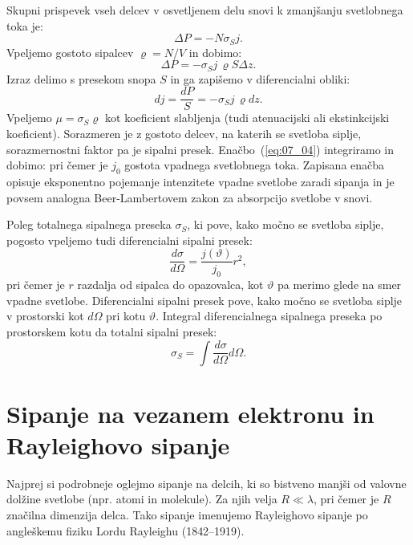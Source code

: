 Skupni prispevek vseh delcev v osvetljenem delu snovi k zmanjšanju svetlobnega toka
je:
\begin{equation}
\Delta P = - N \sigma_S j.
\label{eq:07_02}
\end{equation}
Vpeljemo gostoto sipalcev $\varrho = N/V$ in dobimo:
\begin{equation}
\Delta P = - \sigma_S j\,\varrho S \Delta z.
\label{eq:07_03}
\end{equation}
Izraz delimo s presekom snopa $S$ in ga zapišemo v diferencialni obliki:
\begin{equation}
dj = \frac{dP}{S} = - \sigma_S j\, \varrho dz.
\label{eq:07_04}
\end{equation}
Vpeljemo $\mu = \sigma_S \varrho$ kot koeficient slabljenja
(tudi atenuacijski ali ekstinkcijski
koeficient). Sorazmeren je z gostoto delcev, na katerih se svetloba siplje, sorazmernostni
faktor pa je sipalni presek. Enačbo~(\ref{eq:07_04}) integriramo in dobimo:
pri čemer je $j_0$ gostota vpadnega svetlobnega toka. Zapisana enačba 
opisuje eksponentno pojemanje intenzitete vpadne svetlobe zaradi 
sipanja in je povsem analogna Beer-Lambertovem zakon za absorpcijo svetlobe v snovi. 

\begin{remark}
Poleg totalnega sipalnega preseka $\sigma_S$, ki pove, kako močno se svetloba siplje,
pogosto vpeljemo tudi diferencialni sipalni presek:
\begin{equation}
\frac{d\sigma}{d\Omega} = \frac{j(\vartheta)}{j_0} r^2,
\label{eq:07_04a}
\end{equation}
pri čemer je $r$ razdalja od sipalca do opazovalca, kot $\vartheta$ pa merimo
glede na smer vpadne svetlobe. Diferencialni sipalni
presek pove, kako močno se svetloba siplje v prostorski kot $d\Omega$ pri kotu $\vartheta$. 
Integral diferencialnega sipalnega preseka po prostorskem kotu da totalni
sipalni presek:
\begin{equation}
\sigma_S = \int \frac{d\sigma}{d\Omega} d\Omega.
\label{eq:07_04b}
\end{equation}
\end{remark}

\section{Sipanje na vezanem elektronu in Rayleighovo sipanje}
Najprej si podrobneje oglejmo sipanje na delcih, ki so bistveno manjši 
od valovne dolžine svetlobe (npr. atomi in molekule). Za njih velja $R \ll \lambda$, 
pri čemer je $R$ značilna dimenzija delca. Tako sipanje imenujemo 
Rayleighovo sipanje po angleškemu fiziku Lordu 
Rayleighu (1842--1919).

